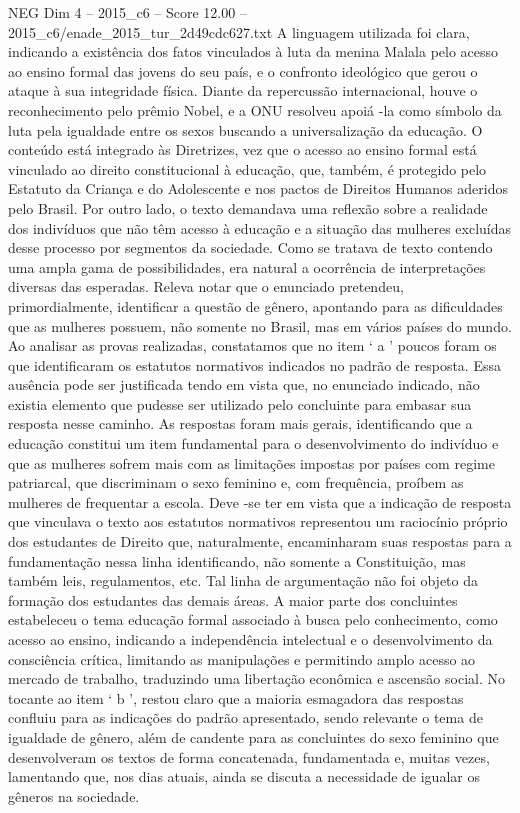 \begin{textsample}{NEG Dim 4 – 2015\_c6 – Score 12.00 – 2015\_c6/enade\_2015\_tur\_2d49cdc627.txt}
A linguagem utilizada foi clara, indicando a existência dos fatos vinculados à luta da menina Malala pelo acesso ao ensino formal das jovens do seu país, e o confronto ideológico que gerou o ataque à sua integridade física.
Diante da repercussão internacional, houve o reconhecimento pelo prêmio Nobel, e a ONU resolveu apoiá -la como símbolo da luta pela igualdade entre os sexos buscando a universalização da educação.
O conteúdo está integrado às Diretrizes, vez que o acesso ao ensino formal está vinculado ao direito constitucional à educação, que, também, é protegido pelo Estatuto da Criança e do Adolescente e nos pactos de Direitos Humanos aderidos pelo Brasil.
Por outro lado, o texto demandava uma reflexão sobre a realidade dos indivíduos que não têm acesso à educação e a situação das mulheres excluídas desse processo por segmentos da sociedade.
Como se tratava de texto contendo uma ampla gama de possibilidades, era natural a ocorrência de interpretações diversas das esperadas.
Releva notar que o enunciado pretendeu, primordialmente, identificar a questão de gênero, apontando para as dificuldades que as mulheres possuem, não somente no Brasil, mas em vários países do mundo.
Ao analisar as provas realizadas, constatamos que no item ‘ a ’ poucos foram os que identificaram os estatutos normativos indicados no padrão de resposta.
Essa ausência pode ser justificada tendo em vista que, no enunciado indicado, não existia elemento que pudesse ser utilizado pelo concluinte para embasar sua resposta nesse caminho.
As respostas foram mais gerais, identificando que a educação constitui um item fundamental para o desenvolvimento do indivíduo e que as mulheres sofrem mais com as limitações impostas por países com regime patriarcal, que discriminam o sexo feminino e, com frequência, proíbem as mulheres de frequentar a escola.
Deve -se ter em vista que a indicação de resposta que vinculava o texto aos estatutos normativos representou um raciocínio próprio dos estudantes de Direito que, naturalmente, encaminharam suas respostas para a fundamentação nessa linha identificando, não somente a Constituição, mas também leis, regulamentos, etc.
Tal linha de argumentação não foi objeto da formação dos estudantes das demais áreas.
A maior parte dos concluintes estabeleceu o tema educação formal associado à busca pelo conhecimento, como acesso ao ensino, indicando a independência intelectual e o desenvolvimento da consciência crítica, limitando as manipulações e permitindo amplo acesso ao mercado de trabalho, traduzindo uma libertação econômica e ascensão social.
No tocante ao item ‘ b ’, restou claro que a maioria esmagadora das respostas confluiu para as indicações do padrão apresentado, sendo relevante o tema de igualdade de gênero, além de candente para as concluintes do sexo feminino que desenvolveram os textos de forma concatenada, fundamentada e, muitas vezes, lamentando que, nos dias atuais, ainda se discuta a necessidade de igualar os gêneros na sociedade.

\end{textsample}
